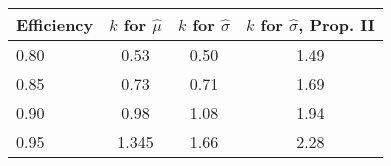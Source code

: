 {\small
\begin{tabular}{lccc}
  \hline
Efficiency & $k$ for $\hat\mu$ & $k$ for $\hat\sigma$ & $k$ for $\hat\sigma$, Prop. II \\ 
  \hline
  0.80 & 0.53  & 0.50 & 1.49 \\ 
  0.85 & 0.73  & 0.71 & 1.69 \\ 
  0.90 & 0.98  & 1.08 & 1.94 \\ 
  0.95 & 1.345 & 1.66 & 2.28 \\ 
   \hline
\end{tabular}
}
